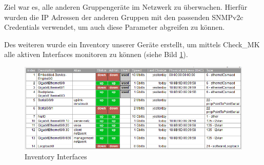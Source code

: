 Ziel war es, alle anderen Gruppengeräte im Netzwerk zu überwachen. Hierfür wurden die \ac{IP} Adressen der anderen Gruppen mit den passenden SNMPv2c Credentials verwendet, um auch diese Parameter abgreifen zu können.


Des weiteren wurde ein Inventory unserer Geräte erstellt, um mittels Check\_MK alle aktiven Interfaces monitoren zu können (siehe Bild \ref{img:inventory_interfaces}).

\begin{figure}[H]
	\centering
	\includegraphics[scale=0.65]{img/inventory_interfaces.PNG}
	\caption{Inventory Interfaces}
	\label{img:inventory_interfaces}
\end{figure}